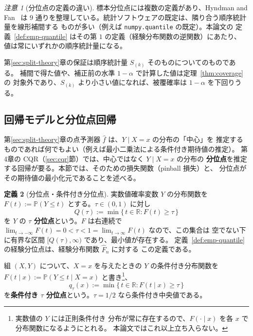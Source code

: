 \documentclass[a4paper,11pt]{jsarticle}
\theoremstyle{definition}
\newtheorem{definition}{定義}[section]
\theoremstyle{plain}
\theoremstyle{remark}
\newtheorem{remark}[definition]{注意}
\newcommand{\Prob}{\mathbb{P}}
\newcommand{\Real}{\mathbb{R}}
\newcommand{\fhat}{\hat{f}}
\begin{document}
\begin{remark}[分位点の定義の違い]
  \label{rem:quantile-types}
  標本分位点には複数の定義があり、Hyndman and Fan~\cite{hyndman1996sample} は
  $9$ 通りを整理している。統計ソフトウェアの既定は、隣り合う順序統計量を線形補間する
  ものが多い（例えば \texttt{numpy.quantile} の既定）。本論文の
  定義~\ref{def:emp-quantile} はその第 $1$ の定義（経験分布関数の逆関数）にあたり、
  値は常にいずれかの順序統計量になる。

  第\ref{sec:split-theory}章の保証は順序統計量 $S_{(k)}$ そのものについてのものである。
  補間で得た値や、補正前の水準 $1-\alpha$ で計算した値は定理~\ref{thm:coverage} の
  対象外であり、$S_{(k)}$ より小さい値になれば、被覆確率は $1-\alpha$ を下回りうる。
\end{remark}

\subsection{回帰モデルと分位点回帰}
\label{sec:quantile-regression}

第\ref{sec:split-theory}章の点予測器 $\fhat$ は、$Y\mid X=x$ の分布の「中心」を
推定するものであれば何でもよい（例えば最小二乗法による条件付き期待値の推定）。
第4章の CQR（\ref{sec:cqr}節）では、中心ではなく $Y\mid X=x$ の分布の
\textbf{分位点}を推定する回帰が要る。本節では、そのための損失関数（pinball 損失）と、
分位点がその期待値の最小化元であることを述べる。

\begin{definition}[分位点・条件付き分位点]
  \label{def:cond-quantile}
  実数値確率変数 $Y$ の分布関数を $F(t):=\Prob(Y\le t)$ とする。$\tau\in(0,1)$ に対し
  \begin{equation*}
    Q(\tau):=\min\{\,t\in\Real: F(t)\ge\tau\,\}
  \end{equation*}
  を $Y$ の \textbf{$\tau$ 分位点}という。$F$ は右連続で
  $\lim_{t\to-\infty}F(t)=0<\tau<1=\lim_{t\to\infty}F(t)$ なので、この集合は
  空でない下に有界な区間 $[Q(\tau),\infty)$ であり、最小値が存在する。
  定義~\ref{def:emp-quantile} の経験分位点は、経験分布関数 $\hat F_n$ に対する
  この定義である。

  組 $(X,Y)$ について、$X=x$ を与えたときの $Y$ の条件付き分布関数を
  $F(t\mid x):=\Prob(Y\le t\mid X=x)$ と書き\footnote{実数値の $Y$ には正則条件付き
  分布が常に存在するので、$F(\cdot\mid x)$ を各 $x$ で分布関数になるようにとれる。
  本論文ではこれ以上立ち入らない。}、
  \begin{equation*}
    q_\tau(x):=\min\{\,t\in\Real: F(t\mid x)\ge\tau\,\}
  \end{equation*}
  を\textbf{条件付き $\tau$ 分位点}という。$\tau=1/2$ なら条件付き中央値である。
\end{definition}
\end{document}
